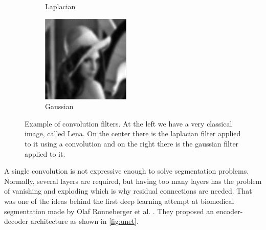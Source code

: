 \begin{figure}[H]
\begin{subfigure}[b]{0.3\textwidth}
    \caption{Laplacian}
  \end{subfigure}
  \hfill
  \begin{subfigure}[b]{0.3\textwidth}
    \includegraphics[width=\textwidth]{imgs/conv/lena3.png}
    \caption{Gaussian}
  \end{subfigure}
    \caption{Example of convolution filters. At the left we have a very classical image, called Lena. On the center there is the laplacian filter applied to it using a convolution and on the right there is the gaussian filter applied to it.}
    \label{fig:conv_ex}
\end{figure}

A single convolution is not expressive enough to solve segmentation problems. Normally, several layers are required, but having too many layers has the problem of vanishing and exploding which is why residual connections are needed. That was one of the ideas behind the first deep learning attempt at biomedical segmentation made by Olaf Ronneberger et al. \cite{unet}. They proposed an encoder-decoder architecture as shown in \autoref{fig:unet}.

